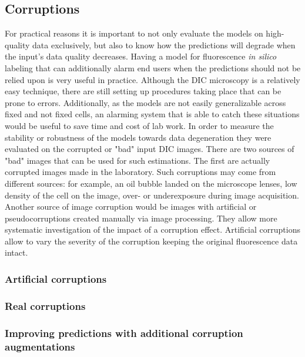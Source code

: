 
\subsection{Corruptions}  
    For practical reasons it is important to not only evaluate the models on high-quality data exclusively, but also to know how the predictions will degrade when the input's data quality decreases. Having a model for fluorescence \textit{in silico} labeling that can additionally alarm end users when the predictions should not be relied upon is very useful in practice. Although the DIC microscopy is a relatively easy technique, there are still setting up procedures taking place that can be prone to errors. Additionally, as the models are not easily generalizable across fixed and not fixed cells, an alarming system that is able to catch these situations would be useful to save time and cost of lab work. In order to measure the stability or robustness of the models towards data degeneration they were evaluated on the corrupted or "bad" input DIC images. There are two sources of "bad" images that can be used for such estimations. The first are actually corrupted images made in the laboratory. Such corruptions may come from different sources: for example, an oil bubble landed on the microscope lenses, low density of the cell on the image, over- or underexposure during image acquisition. Another source of image corruption would be images with artificial or pseudocorruptions created manually via image processing. They allow more systematic investigation of the impact of a corruption effect. Artificial corruptions allow to vary the severity of the corruption keeping the original fluorescence data intact.
    
    \subsubsection{Artificial corruptions}
        
    \subsubsection{Real corruptions}
        \label{section:real-corruptions}
        
    \subsubsection{Improving predictions with additional corruption augmentations}
        \label{section:augments-againts-corruptions}
        
